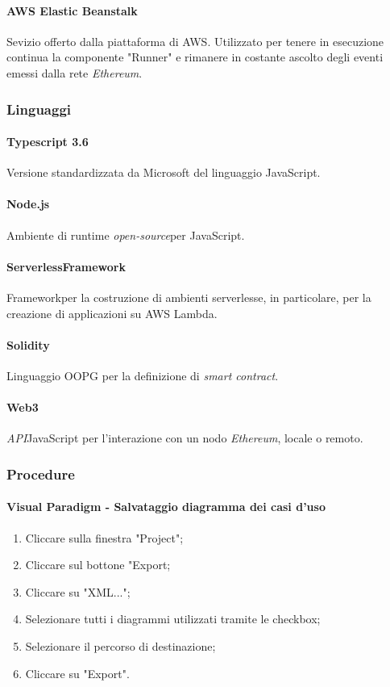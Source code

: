 \paragraph{AWS Elastic Beanstalk}
Sevizio offerto dalla piattaforma di AWS. Utilizzato per tenere in esecuzione continua la componente "Runner" e rimanere in costante ascolto degli eventi emessi dalla rete \textit{Ethereum\glo}.

\newpage \subsubsection{Linguaggi}
\paragraph{Typescript 3.6}
Versione standardizzata da Microsoft del linguaggio JavaScript.

\paragraph{Node.js}
Ambiente di runtime \textit{open-source}\glo per JavaScript.

\paragraph{Serverless\glo Framework\glo}
Framework\glo per la costruzione di ambienti serverless\glos e, in particolare, per la creazione di applicazioni su AWS Lambda.

\paragraph{Solidity}
Linguaggio OOPG per la definizione di \textit{smart contract}\glos.

\paragraph{Web3}
\textit{API}\glo JavaScript per l’interazione con un nodo \textit{Ethereum\glos}, locale o remoto.\\

 

\subsubsection{Procedure}
\paragraph{Visual Paradigm - Salvataggio diagramma dei casi d'uso}
\begin{enumerate}
	\item Cliccare sulla finestra "Project";
	\item Cliccare sul bottone "Export;
	\item Cliccare su "XML...";
	\item Selezionare tutti i diagrammi utilizzati tramite le checkbox;
	\item Selezionare il percorso di destinazione;
	\item Cliccare su "Export".
\end{enumerate}

